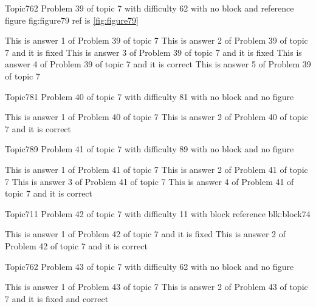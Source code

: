 \documentclass[master]{exam}
\begin{document}
\begin{problem}{Topic7}{62}
	Problem 39 of topic 7 with difficulty 62 with no block and reference figure fig:figure79 ref is \ref{fig:figure79}
	\begin{answers}
		\answer This is answer 1 of Problem 39 of topic 7 
		\answer[fixed] This is answer 2 of Problem 39 of topic 7 and it is fixed
		\answer[fixed] This is answer 3 of Problem 39 of topic 7 and it is fixed
		\answer[correct] This is answer 4 of Problem 39 of topic 7 and it is correct
		\answer This is answer 5 of Problem 39 of topic 7 
	\end{answers}
\end{problem}

\begin{problem}{Topic7}{81}
	Problem 40 of topic 7 with difficulty 81 with no block and no figure
	\begin{answers}
		\answer This is answer 1 of Problem 40 of topic 7 
		\answer[correct] This is answer 2 of Problem 40 of topic 7 and it is correct
	\end{answers}
\end{problem}

\begin{problem}{Topic7}{89}
	Problem 41 of topic 7 with difficulty 89 with no block and no figure
	\begin{answers}
		\answer This is answer 1 of Problem 41 of topic 7 
		\answer This is answer 2 of Problem 41 of topic 7 
		\answer This is answer 3 of Problem 41 of topic 7 
		\answer[correct] This is answer 4 of Problem 41 of topic 7 and it is correct
	\end{answers}
\end{problem}

\begin{problem}[requires=blk:block74]{Topic7}{11}
	Problem 42 of topic 7 with difficulty 11 with block reference blk:block74
	\begin{answers}
		\answer[fixed] This is answer 1 of Problem 42 of topic 7 and it is fixed
		\answer[correct] This is answer 2 of Problem 42 of topic 7 and it is correct
	\end{answers}
\end{problem}

\begin{problem}{Topic7}{62}
	Problem 43 of topic 7 with difficulty 62 with no block and no figure
	\begin{answers}
		\answer This is answer 1 of Problem 43 of topic 7 
		 This is answer 2 of Problem 43 of topic 7 and it is fixed and correct
	\end{answers}
\end{problem}
\end{document}
